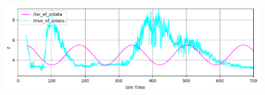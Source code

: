 \documentclass[11pt]{article}
\begin{document}
\begin{center}
\begin{minipage}{0.5\linewidth}
\includegraphics[width=\linewidth]{fig_with_axisname/ikz2.png}
\end{minipage}%
\end{center}
\end{document}
